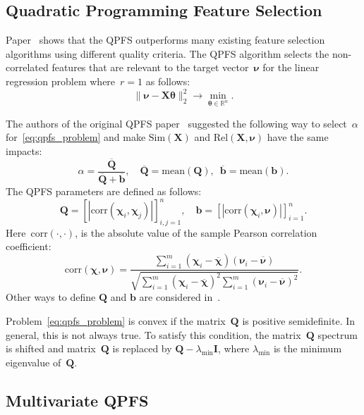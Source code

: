 \documentclass[preprint,authoryear,12pt]{elsarticle}
\theoremstyle{definition}
\newcommand{\bb}{\mathbf{b}}
\newcommand{\bX}{\mathbf{X}}
\newcommand{\bQ}{\mathbf{Q}}
\newcommand{\bbR}{\mathbb{R}}
\newcommand{\bchi}{\boldsymbol{\chi}}
\newcommand{\bnu}{\boldsymbol{\nu}}
\newcommand{\btheta}{\boldsymbol{\theta}}
\begin{document}
\subsection{Quadratic Programming Feature Selection}

Paper~\citep{katrutsa2017comprehensive} shows that the QPFS outperforms many existing feature selection algorithms using different quality criteria.
The QPFS algorithm selects the non-correlated features that are relevant to the target vector~$\bnu$ for the linear regression problem where~$r=1$ as follows:
\begin{equation*}
\| \bnu - \bX \btheta\|_2^2 \rightarrow\min_{\btheta \in \bbR^{n}}.
\end{equation*}

The authors of the original QPFS paper~\citep{rodriguez2010quadratic} suggested the following way to select~$\alpha$ for~\eqref{eq:qpfs_problem} and make $\text{Sim}(\bX)$ and $\text{Rel}(\bX, \bnu)$ have the same impacts:
\begin{equation*}
\alpha = \frac{\overline{\bQ}}{\overline{\bQ} + \overline{\bb}}, \quad \overline{\bQ} = \text{mean} (\bQ), \,\,\, \overline{\bb}= \text{mean} (\bb).
\end{equation*}
The QPFS parameters are defined as follows:
\begin{equation}
\bQ = \left[|\text{corr}(\bchi_i, \bchi_j)|\right]_{i,j=1}^n, \quad \bb = \left[|\text{corr}(\bchi_i, \bnu)|\right]_{i=1}^n.
\label{eq:qpfs_1d_qb}
\end{equation}
Here~$\text{corr}(\cdot, \cdot)$, is the absolute value of the sample Pearson correlation coefficient:
\begin{equation*}
\text{corr}(\bchi, \bnu) = \frac{\sum_{i=1}^m(\bchi_i - \overline{\bchi})( \bnu_i - \overline{\bnu})}{\sqrt{\sum_{i=1}^m(\bchi_i - \overline{\bchi})^2\sum_{i=1}^m(\bnu_i - \overline{\bnu})^2}}.
\end{equation*}
Other ways to define $\bQ$ and $\bb$ are considered in~\citep{katrutsa2017comprehensive}.

Problem~\eqref{eq:qpfs_problem} is convex if the matrix~$\bQ$ is positive semidefinite. In general, this is not always true.
To satisfy this condition, the matrix~$\bQ$ spectrum is shifted and matrix~$\bQ$ is replaced by $\bQ - \lambda_{\text{min}} \mathbf{I}$, where $\lambda_{\text{min}} $ is the minimum eigenvalue of~$\bQ$.

\subsection{Multivariate QPFS}
\end{document}
